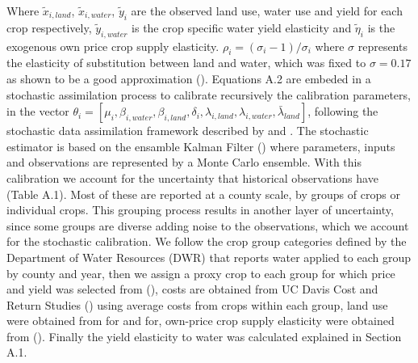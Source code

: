 \documentclass[11pt,a4paper]{article}
\begin{document}
Where $\tilde{x}_{i,land}$, $\tilde{x}_{i,water}$, $\tilde{y}_{i}$ are the observed land use, water use and yield for each crop respectively, $\tilde{y}_{i,water}$ is the crop specific water yield elasticity and $\tilde{\eta}_i$ is the exogenous own price crop supply elasticity. $\rho_{i}=(\sigma_{i}-1)/\sigma_{i}$ where $\sigma$ represents the elasticity of substitution between land and water, which was fixed to $\sigma=0.17$ as shown to be a good approximation  (\cite{howitt_calibrating_2012}). Equations A.2 are embeded in a stochastic assimilation process to calibrate recursively the calibration parameters, in the vector $\theta_{i} = [\mu_{i},\beta_{i,water},\beta_{i,land},\delta_{i},\lambda_{i,land},\lambda_{i,water},\bar{\lambda}_{land}]$, following the stochastic data assimilation framework described by \textcite{maneta_stochastic_2014} and \textcite{maneta_satellite-driven_2020}. The stochastic estimator is based on the ensamble Kalman Filter (\cite{evensen_sequential_1994}) where parameters, inputs and observations are represented by a Monte Carlo ensemble. With this calibration we account for the uncertainty that historical observations have (Table A.1). Most of these are reported at a county scale, by groups of crops or individual crops. This grouping process results in another layer of uncertainty, since some groups are diverse adding noise to the observations, which we account for the stochastic calibration. We follow the crop group categories defined by the Department of Water Resources (DWR) that reports water applied to each group by county and year, then we assign a proxy crop to each group for which price and yield was selected from (\cite{usda_national_2020}), costs are obtained from UC Davis Cost and Return Studies (\cite{uc_davis_current_2015}) using average costs from crops within each group, land use were obtained from for and for, own-price crop supply elasticity were obtained from (\cite{rodriguez-flores_global_2021}). Finally the yield elasticity to water was calculated explained in  Section A.1.
\end{document}
